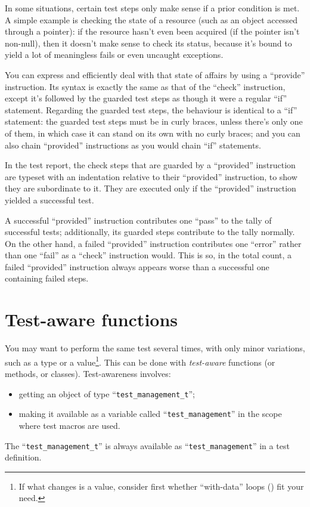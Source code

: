\documentclass[twoside, a4paper, article]{memoir}
\providecommand\typesetexample[1]{%
}
\begin{document}
In some situations, certain test steps only make sense if a prior condition is
met.  A simple example is checking the state of a resource (such as an object
accessed through a pointer): if the resource hasn't even been acquired (if the
pointer isn't non-null), then it doesn't make sense to check its status,
because it's bound to yield a lot of meaningless fails or even uncaught
exceptions.

You can express and efficiently deal with that state of affairs by using a
``provide'' instruction.  Its syntax is exactly the same as that of the
``check'' instruction, except it's followed by the guarded test steps as though
it were a regular ``if'' statement.  Regarding the guarded test steps, the
behaviour is identical to a ``if'' statement: the guarded test steps must be in
curly braces, unless there's only one of them, in which case it can stand on
its own with no curly braces; and you can also chain ``provided'' instructions
as you would chain ``if'' statements.

\typesetexample{provided}

In the test report, the check steps that are guarded by a ``provided''
instruction are typeset with an indentation relative to their ``provided''
instruction, to show they are subordinate to it.  They are executed only if the
``provided'' instruction yielded a successful test.

A successful ``provided'' instruction contributes one ``pass'' to the tally of
successful tests; additionally, its guarded steps contribute to the tally
normally.  On the other hand, a failed ``provided'' instruction contributes one
``error'' rather than one ``fail'' as a ``check'' instruction would.  This is
so, in the total count, a failed ``provided'' instruction always appears worse
than a successful one containing failed steps.

\chapter{Test-aware functions}
\label{cha:test-aware-functions}

You may want to perform the same test several times, with only minor
variations, such as a type or a value\footnote{If what changes is a value,
  consider first whether ``with-data'' loops () fit
  your need.}.  This can be done with \emph{test-aware} functions (or methods,
or classes).  Test-awareness involves:
\begin{itemize}
\item getting an object of type ``\texttt{test\_management\_t}'';
\item making it available as a variable called ``\texttt{test\_management}'' in
  the scope where test macros are used.
\end{itemize}
The ``\texttt{test\_management\_t}'' is always available as
``\texttt{test\_management}'' in a test definition.
\end{document}
